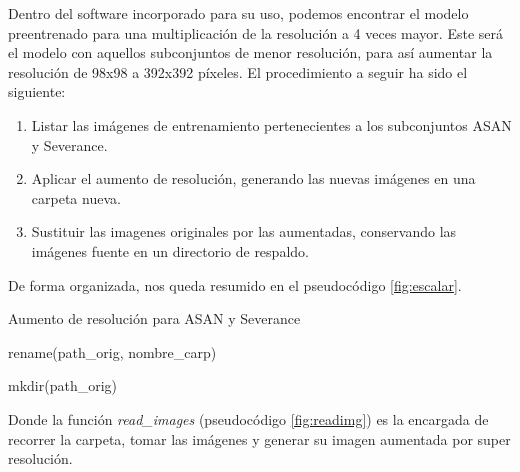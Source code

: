 Dentro del software incorporado para su uso, podemos encontrar el modelo preentrenado para una multiplicación de la resolución a 4 veces mayor. Este será el modelo con aquellos subconjuntos de menor resolución, para así aumentar la resolución de 98x98 a 392x392 píxeles. El procedimiento a seguir ha sido el siguiente:

\begin{enumerate}
	\item Listar las imágenes de entrenamiento pertenecientes a los subconjuntos ASAN y Severance.
	\item Aplicar el aumento de resolución, generando las nuevas imágenes en una carpeta nueva.
	\item Sustituir las imagenes originales por las aumentadas, conservando las imágenes fuente en un directorio de respaldo.
\end{enumerate}

De forma organizada, nos queda resumido en  el pseudocódigo \ref{fig:escalar}.

\begin{algorithm}[H]
	\caption{ Aumento de resolución para ASAN y Severance}
		\label{fig:escalar}
	\begin{algorithmic}
				\State  rename(path\_orig, nombre\_carp)
				
				\State mkdir(path\_orig)
				\State {}
		\EndIf
		\EndProcedure
		
	\end{algorithmic}
\end{algorithm}

Donde la función \textit{read\_images} (pseudocódigo \ref{fig:readimg}) es la encargada de recorrer la carpeta, tomar las imágenes y generar su imagen aumentada por super resolución.

